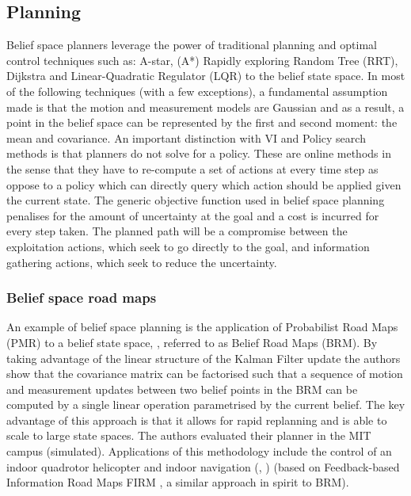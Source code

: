 \subsection{Planning}\label{lit:Planning}

Belief space planners leverage the power of traditional planning and optimal control techniques such as: A-star, (A*) Rapidly exploring Random Tree (RRT), Dijkstra and 
Linear-Quadratic Regulator (LQR) to the belief state space. 
In most of the following techniques (with a few exceptions), a fundamental assumption made is that the motion and measurement models are Gaussian 
and as a result, a point in the belief space can be represented by the first and second moment: the mean and covariance. An important distinction with VI and Policy search methods is that planners
do not solve for a policy. These are online methods in the sense that they have to re-compute a set of 
actions at every time step as oppose to a policy which can directly query which action should be applied given the current state. 
The generic objective function used in belief space planning penalises for the amount of uncertainty at the goal and a cost is incurred 
for every step taken. The planned path will be a compromise between the exploitation actions, which seek to go directly to the goal, and information gathering actions, which seek to reduce the uncertainty.

\subsubsection{Belief space road maps}

An example of belief space planning is the application of Probabilist Road Maps (PMR) to a belief state space, \cite{BelRoadMap_2009}, referred to as Belief Road Maps (BRM). By taking advantage of the linear structure of the Kalman Filter update the authors show that the covariance matrix can be factorised such that a sequence of motion and measurement updates between two belief points in the BRM can be computed by a single linear operation parametrised by the current belief. 
The key advantage of this approach is that it allows for rapid replanning and is able to scale to large state spaces. 
The authors evaluated their planner in the MIT campus (simulated). Applications of this methodology include the control of an indoor 
quadrotor helicopter \cite{Quadrator_2008} and indoor navigation (\cite{FIRM_2011}, \cite{rob_online_bs_icra_2014}) 
(based on Feedback-based Information Road Maps FIRM , a similar approach in spirit to BRM).

